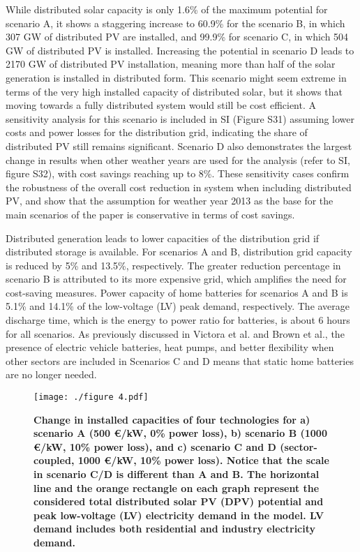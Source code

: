 \documentclass[review]{elsarticle}
\begin{document}
	While distributed solar capacity is only 1.6\% of the maximum potential for scenario A, it shows a staggering increase to 60.9\% for the scenario B, in which 307 GW of distributed PV are installed, and 99.9\% for scenario C, in which 504 GW of distributed PV is installed. Increasing the potential in scenario D leads to 2170 GW of distributed PV installation, meaning more than half of the solar generation is installed in distributed form. This scenario might seem extreme in terms of the very high installed capacity of distributed solar, but it shows that moving towards a fully distributed system would still be cost efficient. A sensitivity analysis for this scenario is included in SI (Figure S31) assuming lower costs and power losses for the distribution grid, indicating the share of distributed PV still remains significant. Scenario D also demonstrates the largest change in results when other weather years are used for the analysis (refer to SI, figure S32), with cost savings reaching up to 8\%. These sensitivity cases confirm the robustness of the overall cost reduction in system when including distributed PV, and show that the assumption for weather year 2013 as the base for the main scenarios of the paper is conservative in terms of cost savings.
	
	Distributed generation leads to lower capacities of the distribution grid if distributed storage is available. For scenarios A and B, distribution grid capacity is reduced by 5\% and 13.5\%, respectively. The greater reduction percentage in scenario B is attributed to its more expensive grid, which amplifies the need for cost-saving measures. Power capacity of home batteries for scenarios A and B is 5.1\% and 14.1\% of the low-voltage (LV) peak demand, respectively. The average discharge time, which is the energy to power ratio for batteries, is about 6 hours for all scenarios. As previously discussed in Victora et al.\cite{victoria_2019role} and Brown et al.\cite{brown_2018}, the presence of electric vehicle batteries, heat pumps, and better flexibility when other sectors are included in Scenarios C and D means that static home batteries are no longer needed.
	
	\begin{figure}
		\texttt{[image: ./figure 4.pdf]}
		\caption{\textbf{Change in installed capacities of four technologies for a) scenario A (500 €/kW, 0\% power loss), b) scenario B (1000 €/kW, 10\% power loss), and c) scenario C and D (sector-coupled, 1000 €/kW, 10\% power loss). Notice that the scale in scenario C/D is different than A and B. 
				The horizontal line and the orange rectangle on each graph represent the considered total distributed solar PV (DPV) potential and peak low-voltage (LV) electricity demand in the model. LV demand includes both residential and industry electricity demand.}}
		\label{fig:capacities}
	\end{figure}
	
\end{document}
